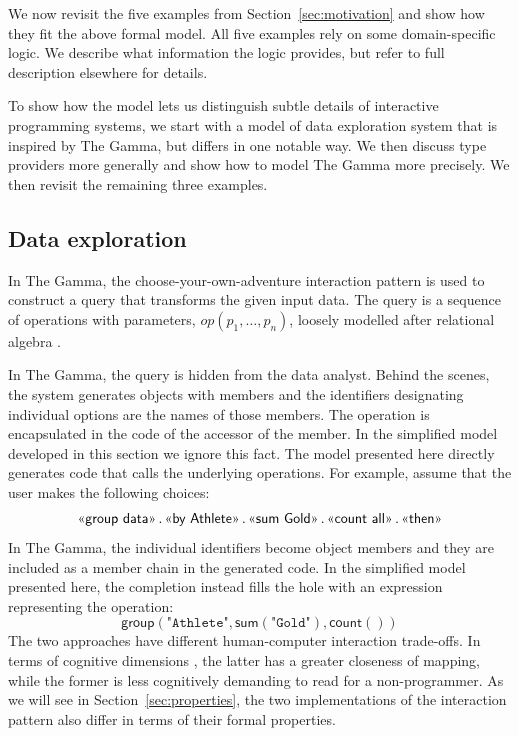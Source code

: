 \documentclass[anonymous, a4paper,UKenglish,cleveref, autoref, thm-restate]{lipics-v2021}
\newcommand{\ident}[1]{\textsf{#1}}
\newcommand{\ddident}[1]{\guillemotleft\ident{#1}\guillemotright}
\newcommand{\op}{\textit{op}}
\begin{document}
We now revisit the five examples from Section~\ref{sec:motivation} and show how they fit the
above formal model. All five examples rely on some domain-specific logic. We describe what
information the logic provides, but refer to full description elsewhere for details.

To show how the model lets us distinguish subtle details of interactive programming systems,
we start with a model of data exploration system that is inspired by The Gamma, but differs in
one notable way. We then discuss type providers more generally and show how to model The Gamma
more precisely. We then revisit the remaining three examples.


\subsection{Data exploration}
\label{sec:examples-data}

In The Gamma, the choose-your-own-adventure interaction pattern is used to construct a
query that transforms the given input data. The query is a sequence of operations with parameters,
$\op(p_1, \ldots, p_n)$, loosely modelled after relational algebra \cite{codd-1970-relational}.

In The Gamma, the query is hidden from the data analyst. Behind the scenes, the system generates
objects with members and the identifiers designating individual options are the names of those
members. The operation is encapsulated in the code of the accessor of the member. In the
simplified model developed in this section we ignore this fact. The model presented here directly
generates code that calls the underlying operations. For example, assume that the user makes
the following choices:
\[
\textnormal{\ddident{group data}\,.\,\ddident{by Athlete}\,.\,\ddident{sum Gold}\,.\,\ddident{count all}\,.\,\ddident{then}}
\]
In The Gamma, the individual identifiers become object members and they are included as
a member chain in the generated code. In the simplified model presented here, the completion
instead fills the hole with an expression representing the operation:
\[
\ident{group}(\texttt{"Athlete"}, \ident{sum}(\texttt{"Gold"}), \ident{count}())
\]
The two approaches have different human-computer interaction trade-offs. In terms of cognitive
dimensions \cite{green-1989-cogdims,blackwell-2003-cogdims}, the latter has a greater closeness
of mapping, while the former is less cognitively demanding to read for a non-programmer.
As we will see in Section~\ref{sec:properties}, the two implementations of the
interaction pattern also differ in terms of their formal properties.
\end{document}
